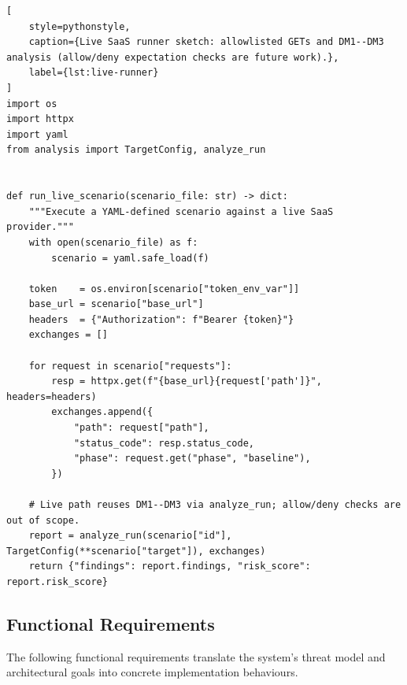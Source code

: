 \documentclass[12pt,a4paper]{report}
\begin{document}
\begin{lstlisting}[
    style=pythonstyle,
    caption={Live SaaS runner sketch: allowlisted GETs and DM1--DM3 analysis (allow/deny expectation checks are future work).},
    label={lst:live-runner}
]
import os
import httpx
import yaml
from analysis import TargetConfig, analyze_run


def run_live_scenario(scenario_file: str) -> dict:
    """Execute a YAML-defined scenario against a live SaaS provider."""
    with open(scenario_file) as f:
        scenario = yaml.safe_load(f)

    token    = os.environ[scenario["token_env_var"]]
    base_url = scenario["base_url"]
    headers  = {"Authorization": f"Bearer {token}"}
    exchanges = []

    for request in scenario["requests"]:
        resp = httpx.get(f"{base_url}{request['path']}", headers=headers)
        exchanges.append({
            "path": request["path"],
            "status_code": resp.status_code,
            "phase": request.get("phase", "baseline"),
        })

    # Live path reuses DM1--DM3 via analyze_run; allow/deny checks are out of scope.
    report = analyze_run(scenario["id"], TargetConfig(**scenario["target"]), exchanges)
    return {"findings": report.findings, "risk_score": report.risk_score}
\end{lstlisting}

\subsection{Functional Requirements}

The following functional requirements translate the system's threat model and architectural
goals into concrete implementation behaviours.
\end{document}
